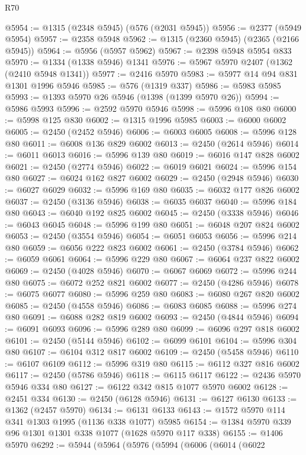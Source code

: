 \begin{lexlean}{R70}
\begin{coremodule}
@5954 := @1315 (@2348 @5945) (@576 (@2031 @5945))
@5956 := @2377 (@5949 @5954)
@5957 := @2358 @5948
@5962 := @1315 (@2360 @5945) (@2365 (@2166 @5945))
@5964 := @5956 (@5957 @5962)
@5967 := @2398 @5948 @5954 @833
@5970 := @1334 (@1338 @5946) @1341
@5976 := @5967 @5970 @2407 (@1362 (@2410 @5948 @1341))
@5977 := @2416 @5970
@5983 := @5977 @14 @94 @831 @1301 @1996 @5946
@5985 := @576 (@1319 @337)
@5986 := @5983 @5985
@5993 := @1393 @5970 @26 @5946 (@1398 (@1399 @5970 @26))
@5994 := @5986 @5993
@5996 := @2592 @5970 @5946
@5998 := @5996 @108 @80
@6000 := @5998 @125 @830
@6002 := @1315 @1996 @5985
@6003 := @6000 @6002
@6005 := @2450 (@2452 @5946)
@6006 := @6003 @6005
@6008 := @5996 @128 @80
@6011 := @6008 @136 @829 @6002
@6013 := @2450 (@2614 @5946)
@6014 := @6011 @6013
@6016 := @5996 @139 @80
@6019 := @6016 @147 @828 @6002
@6021 := @2450 (@2774 @5946)
@6022 := @6019 @6021
@6024 := @5996 @154 @80
@6027 := @6024 @162 @827 @6002
@6029 := @2450 (@2948 @5946)
@6030 := @6027 @6029
@6032 := @5996 @169 @80
@6035 := @6032 @177 @826 @6002
@6037 := @2450 (@3136 @5946)
@6038 := @6035 @6037
@6040 := @5996 @184 @80
@6043 := @6040 @192 @825 @6002
@6045 := @2450 (@3338 @5946)
@6046 := @6043 @6045
@6048 := @5996 @199 @80
@6051 := @6048 @207 @824 @6002
@6053 := @2450 (@3554 @5946)
@6054 := @6051 @6053
@6056 := @5996 @214 @80
@6059 := @6056 @222 @823 @6002
@6061 := @2450 (@3784 @5946)
@6062 := @6059 @6061
@6064 := @5996 @229 @80
@6067 := @6064 @237 @822 @6002
@6069 := @2450 (@4028 @5946)
@6070 := @6067 @6069
@6072 := @5996 @244 @80
@6075 := @6072 @252 @821 @6002
@6077 := @2450 (@4286 @5946)
@6078 := @6075 @6077
@6080 := @5996 @259 @80
@6083 := @6080 @267 @820 @6002
@6085 := @2450 (@4558 @5946)
@6086 := @6083 @6085
@6088 := @5996 @274 @80
@6091 := @6088 @282 @819 @6002
@6093 := @2450 (@4844 @5946)
@6094 := @6091 @6093
@6096 := @5996 @289 @80
@6099 := @6096 @297 @818 @6002
@6101 := @2450 (@5144 @5946)
@6102 := @6099 @6101
@6104 := @5996 @304 @80
@6107 := @6104 @312 @817 @6002
@6109 := @2450 (@5458 @5946)
@6110 := @6107 @6109
@6112 := @5996 @319 @80
@6115 := @6112 @327 @816 @6002
@6117 := @2450 (@5786 @5946)
@6118 := @6115 @6117
@6122 := @2436 @5970 @5946 @334 @80
@6127 := @6122 @342 @815 @1077 @5970 @6002
@6128 := @2451 @334
@6130 := @2450 (@6128 @5946)
@6131 := @6127 @6130
@6133 := @1362 (@2457 @5970)
@6134 := @6131 @6133
@6143 := @1572 @5970 @114 @341 @1303 @1995 (@1136 @338 @1077) @5985
@6154 := @1384 @5970 @339 @96 @1301 @1301 @338 @1077 (@1628 @5970 @117 @338)
@6155 := @1406 @5970
@6292 := @5944
    (@5964
      (@5976
        (@5994
          (@6006
            (@6014
              (@6022

\end{coremodule}
\end{lexlean}

